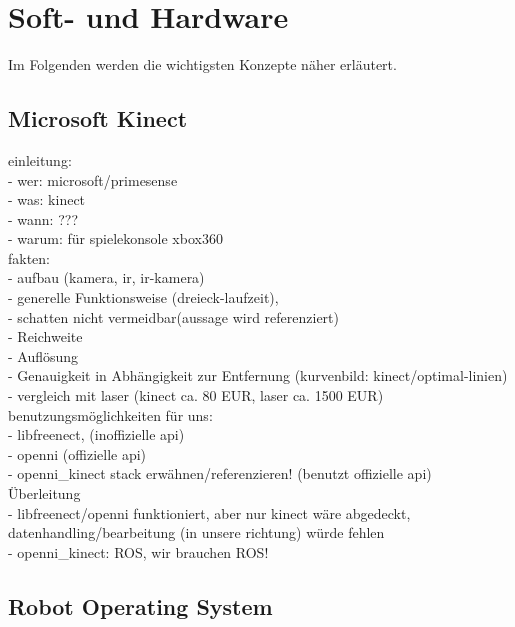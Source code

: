 \section{Soft- und Hardware}
\label{sec:softundhardware}

Im Folgenden werden die wichtigsten Konzepte näher erläutert.

\subsection{Microsoft Kinect}
\label{subsec:kinect}



{\color{red}

einleitung:\\
- wer: microsoft/primesense\\
- was: kinect\\
- wann: ???\\
- warum: für spielekonsole xbox360\\

fakten:\\
- aufbau (kamera, ir, ir-kamera)\\
- generelle Funktionsweise (dreieck-laufzeit), \\
- schatten nicht vermeidbar(aussage wird referenziert)\\
- Reichweite\\
- Auflösung\\
- Genauigkeit in Abhängigkeit zur Entfernung (kurvenbild: kinect/optimal-linien)\\
- vergleich mit laser (kinect ca. 80 EUR, laser ca. 1500 EUR)\\

benutzungsmöglichkeiten für uns:\\
- libfreenect, (inoffizielle api)\\
- openni (offizielle api)\\
- openni\_kinect stack erwähnen/referenzieren! (benutzt offizielle api)\\

Überleitung\\
- libfreenect/openni funktioniert, aber nur kinect wäre abgedeckt, datenhandling/bearbeitung (in unsere richtung) würde fehlen\\
- openni\_kinect: ROS, wir brauchen ROS!\\
}

\subsection{Robot Operating System}

